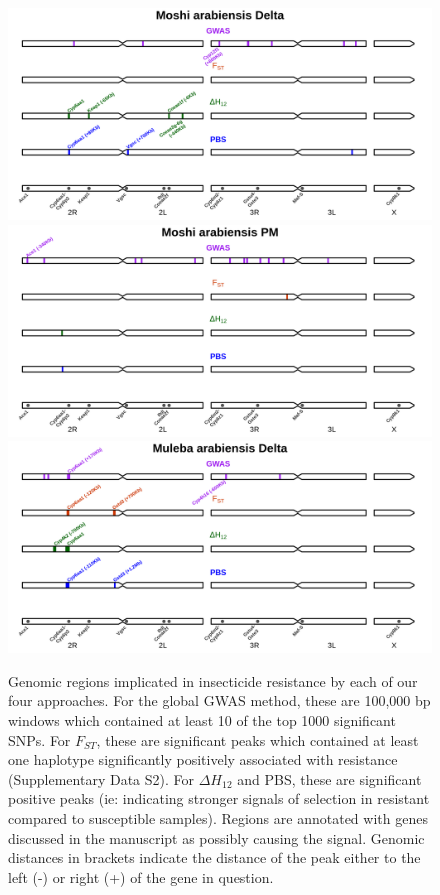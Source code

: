 \documentclass[a4paper,12pt]{article}
\begin{document}
\clearpage

\begin{figure}[h]
	\hspace{2cm}\includegraphics*[width = 13cm]{../supplementary_implicated_regions/Moshi_arabiensis_Delta_implicated_regions.png}
	\vskip 0.8cm
	\hspace{2cm}\includegraphics*[width = 13cm]{../supplementary_implicated_regions/Moshi_arabiensis_PM_implicated_regions.png}
	\vskip 0.8cm
	\hspace{2cm}\includegraphics*[width = 13cm]{../supplementary_implicated_regions/Muleba_arabiensis_Delta_implicated_regions.png}
	\caption{\footnotesize Genomic regions implicated in insecticide resistance by each of our four approaches. For the global GWAS method, these are 100,000 bp windows which contained at least 10 of the top 1000 significant SNPs. For $F_{ST}$, these are significant peaks which contained at least one haplotype significantly positively associated with resistance (Supplementary Data S2). For $\Delta H_{12}$ and PBS, these are significant positive peaks (ie: indicating stronger signals of selection in resistant compared to susceptible samples). Regions are annotated with genes discussed in the manuscript as possibly causing the signal. Genomic distances in brackets indicate the distance of the peak either to the left (-) or right (+) of the gene in question.}

\end{figure}
\end{document}
